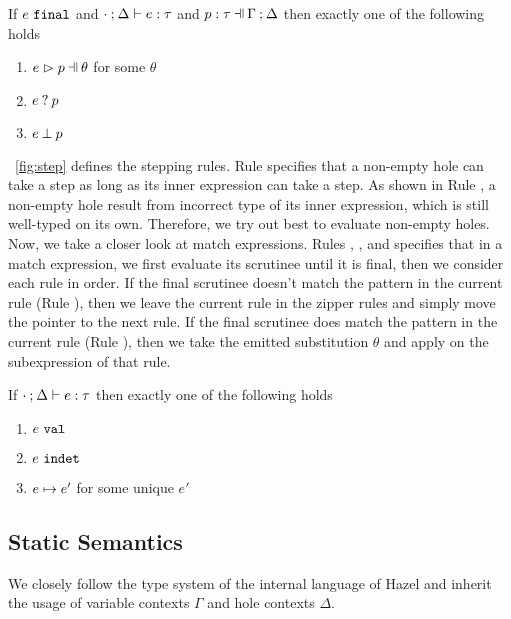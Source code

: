 \documentclass[runningheads,envcountsame,a4paper]{llncs}
\begin{document}
\begin{lemma}
  \label{lem:match-determinism}
  If $e ~\mathtt{final}$ and $\cdot \mathbin{;} \Delta \vdash e : \tau$ and $\hpattyp{p}{\tau}{\Gamma}{\Delta}$ then exactly one of the following holds
  \begin{enumerate}
    \item $\hpatmatch{e}{p}{\theta}$ for some $\theta$
    \item $e \mathbin{?} p$
    \item $e \mathbin{\bot} p$
  \end{enumerate}
\end{lemma}


\figurename~\ref{fig:step} defines the stepping rules. Rule
\ITHole specifies that a non-empty hole can take a step as long as its inner
expression can take a step. As shown in Rule \THole, a non-empty hole result
from incorrect type of its inner expression, which is still well-typed on its
own. Therefore, we try out best to evaluate non-empty holes. Now, we take a
closer look at match expressions. Rules \ITExpMatch, \ITSuccMatch, and
\ITFailMatch specifies that in a match expression, we first evaluate its
scrutinee until it is final, then we consider each rule in order. If the final
scrutinee doesn't match the pattern in the current rule (Rule \ITFailMatch),
then we leave the current rule in the zipper rules and simply move the pointer
to the next rule. If the final scrutinee does match the pattern in the current
rule (Rule \ITSuccMatch), then we take the emitted substitution $\theta$ and
apply on the subexpression of that rule.

\begin{theorem}[Determinism]
  \label{thrm:determinism}
  If $\cdot \mathbin{;} \Delta \vdash e : \tau$ then exactly one of the following holds
  \begin{enumerate}
    \item $e ~\mathtt{val}$
    \item $e ~\mathtt{indet}$
    \item $e \mapsto e'$ for some unique $e'$
  \end{enumerate}
\end{theorem}

\subsection{Static Semantics}\label{sec:statics}

We closely follow the type system of the internal language of \textsf{Hazel} and inherit the usage of variable contexts $\Gamma$ and hole contexts $\Delta$.
\cite{DBLP:journals/pacmpl/OmarVCH19}
\end{document}
